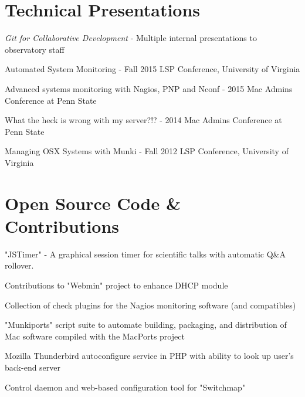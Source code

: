 \documentclass[letterpaper]{deedy-resume}
\begin{document}
\section{Technical Presentations}
\begin{tightitemize}
\vspace{8pt}
\item \textit{Git for Collaborative Development} - Multiple internal presentations to observatory staff
\item Automated System Monitoring - Fall 2015 LSP Conference, University of Virginia \\
\item Advanced systems monitoring with Nagios, PNP and Nconf - 2015 Mac Admins Conference at Penn State \\
\item What the heck is wrong with my server?!? - 2014 Mac Admins Conference at Penn State \\
\item Managing OSX Systems with Munki - Fall 2012 LSP Conference, University of
Virginia \\
\end{tightitemize}

\sectionspace
\section{Open Source Code \& Contributions}
\vspace{8pt}
\begin{tightitemize}
	\item "JSTimer" - A graphical session timer for scientific talks with automatic Q\&A rollover.
	\item Contributions to "Webmin" project to enhance DHCP module
	\item Collection of check plugins for the Nagios monitoring software (and compatibles)
	\item "Munkiports" script suite to automate building, packaging, and distribution of Mac software compiled with the MacPorts project
	\item Mozilla Thunderbird autoconfigure service in PHP with ability to look up user's back-end server
	\item Control daemon and web-based configuration tool for "Switchmap"
\end{tightitemize}
\end{document}
